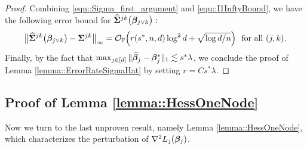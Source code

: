 \documentclass[twoside,11pt]{article}
\newcommand*{\hSigma}{\hat{\bSigma}}
\begin{document}
\begin{proof}
Combining \eqref{eqn::Sigma_first_argument} and \eqref{equ::I1InftyBound}, we have the following error bound for $\hSigma^{jk}\bigl(\bbeta_{j\vee k}\bigr):$
 \begin{align}\label{equ::ErrorSigmaHat}
 \big\|\hSigma^{jk}\bigl(\bbeta_{j\vee k}\bigr) - \bSigma^{jk} \big\|_\infty  = \cO_{\PP} \Bigl(r(s^*,n,d) \log^2 d  + \sqrt{\log d/n} \Bigr) ~~\text{for all}~(j,k).
  \end{align}
 Finally, by the fact that $\max_{j\in [d]}\| \widehat{\bm{\beta}}_j - \bm{\beta}_j^* \|_1 \lesssim s^* \lambda $, we conclude the proof of  Lemma \ref{lemma::ErrorRateSigmaHat} by setting $r = C s^* \lambda$.
\end{proof}

\subsection{Proof of Lemma \ref{lemma::HessOneNode}}\label{proof::lemma::HessOneNode}
Now we turn to the last unproven result, namely Lemma \ref{lemma::HessOneNode}, which characterizes the perturbation of $\nabla ^2 L_j(\bm{\beta}_j)$.
\end{document}
